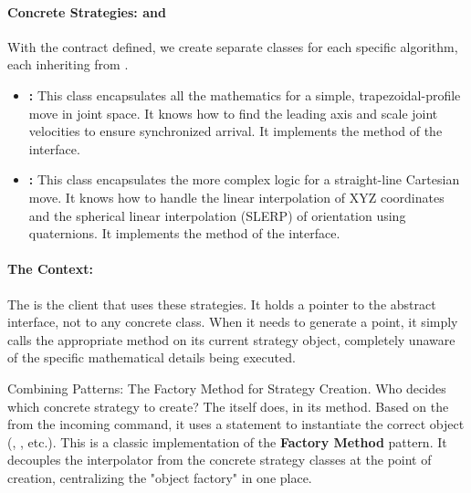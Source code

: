 \paragraph{Concrete Strategies:  and }
With the contract defined, we create separate classes for each specific algorithm, each inheriting from .
\begin{itemize}
    \item \textbf{:} This class encapsulates all the mathematics for a simple, trapezoidal-profile move in joint space. It knows how to find the leading axis and scale joint velocities to ensure synchronized arrival. It implements the  method of the interface.
    
    \item \textbf{:} This class encapsulates the more complex logic for a straight-line Cartesian move. It knows how to handle the linear interpolation of XYZ coordinates and the spherical linear interpolation (SLERP) of orientation using quaternions. It implements the  method of the interface.
\end{itemize}

\paragraph{The Context: }
The  is the client that uses these strategies. It holds a pointer to the abstract  interface, not to any concrete class. When it needs to generate a point, it simply calls the appropriate method on its current strategy object, completely unaware of the specific mathematical details being executed.

\begin{tipbox}{Combining Patterns: The Factory Method for Strategy Creation.}
    Who decides which concrete strategy to create? The  itself does, in its  method. Based on the  from the incoming command, it uses a  statement to instantiate the correct  object (, , etc.). This is a classic implementation of the \textbf{Factory Method} pattern. It decouples the interpolator from the concrete strategy classes at the point of creation, centralizing the "object factory" in one place.
\end{tipbox}

